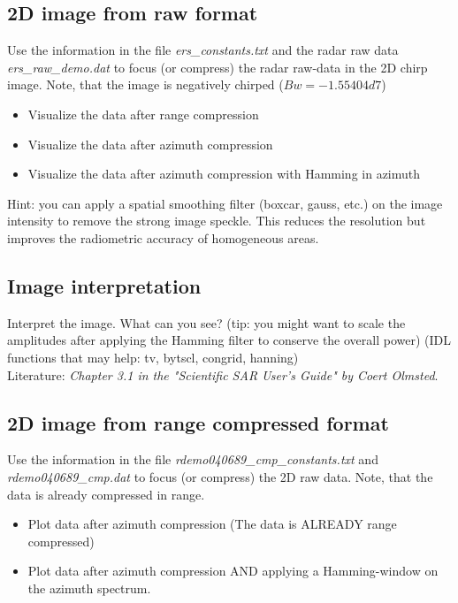 \subsection{2D image from raw format}
Use the information in the file \textit{ers\_constants.txt} and the radar raw data \textit{ers\_raw\_demo.dat} to focus (or compress) the radar raw-data in the 2D chirp image. Note, that the image is negatively chirped ($Bw = -1.55404d7$) 
\begin{itemize}
\item Visualize the data after range compression
\item Visualize the data after azimuth compression
\item Visualize the data after azimuth compression with Hamming in azimuth
\end{itemize}
Hint: you can apply a spatial smoothing filter (boxcar, gauss, etc.) on the image intensity to remove the strong image speckle. This reduces the resolution but improves the radiometric accuracy of homogeneous areas. 
\subsection{Image interpretation}
Interpret the image. What can you see?
(tip: you might want to scale the amplitudes after applying the Hamming filter to conserve the overall power)
(IDL functions that may help: tv, bytscl, congrid, hanning)\\
Literature: \textit{Chapter 3.1 in the "Scientific SAR User's Guide" by Coert Olmsted}.


\subsection{2D image from range compressed format}
Use the information in the file \textit{rdemo040689\_cmp\_constants.txt} and \textit{rdemo040689\_cmp.dat} to focus (or compress) the 2D raw data. Note, that the data is already compressed in range.
\begin{itemize}
\item Plot data after azimuth compression (The data is ALREADY range compressed)
\item Plot data after azimuth compression AND applying a Hamming-window on the azimuth spectrum.
\end{itemize}
